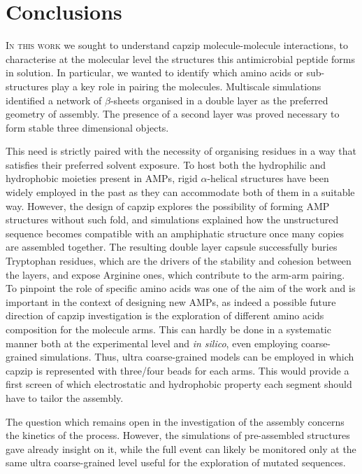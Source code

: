 \chapter{Conclusions} \label{chapter:concl}

\lettrine{I}{n this work} we sought to understand capzip molecule-molecule interactions, to characterise at the molecular level the structures this antimicrobial peptide forms in solution. In particular, we wanted to identify which amino acids or sub-structures play a key role in pairing the molecules. 
%
Multiscale simulations identified a network of $\beta$-sheets organised in a double layer as the preferred geometry of assembly. The presence of a second layer was proved necessary to form stable three dimensional objects.

This need is strictly paired with the necessity of organising residues in a way that satisfies their preferred solvent exposure.
%
To host both the hydrophilic and hydrophobic moieties present in AMPs, rigid $\alpha$-helical structures have been widely employed in the past as they can accommodate both of them in a suitable way. However, the design of capzip explores the possibility of forming AMP structures without such fold, and simulations explained how the unstructured sequence becomes compatible with an amphiphatic structure once many copies are assembled together.
%
The resulting double layer capsule successfully buries Tryptophan residues, which are the drivers of the stability and cohesion between the layers, and expose Arginine ones, which contribute to the arm-arm pairing.
%
To pinpoint the role of specific amino acids was one of the aim of the work and is important in the context of designing new AMPs, as indeed a possible future direction of capzip investigation is the exploration of different amino acids composition for the molecule arms. This can hardly be done in a systematic manner both at the experimental level and \emph{in silico}, even employing coarse-grained simulations. Thus, ultra coarse-grained models can be employed in which capzip is represented with three/four beads for each arms. This would provide a first screen of which electrostatic and hydrophobic property each segment should have to tailor the assembly.

The question which remains open in the investigation of the assembly concerns the kinetics of the process. However, the simulations of pre-assembled structures gave already insight on it, while the full event can likely be monitored only at the same ultra coarse-grained level useful for the exploration of mutated sequences.

